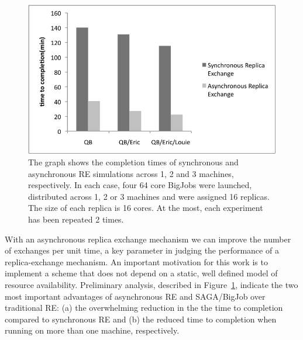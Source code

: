 \documentclass[a4paper,10pt]{article}
\newcommand{\athotanote}[1]{ {\textcolor{green} { ***athota: #1 }}}
\newcommand{\athotanote}[1]{}
\begin{document}
%
\begin{figure}
\centering
\includegraphics[scale=0.50]{figures/combined_graph.pdf}
\caption{\small The graph shows the completion times of synchronous and asynchronous RE simulations across 1, 2 and 3 machines, respectively. In each case, four 64 core BigJobs were launched, distributed across 1, 2 or 3 machines and were assigned 16 replicas. The size of each replica is 16 cores. At the most, each experiment has been repeated 2 times.}
\label{fig:graph}
\vspace{-1em}
\end{figure}

With an asynchronous replica exchange mechanism we can improve the
number of exchanges per unit time, a key parameter in judging the
performance of a replica-exchange mechanism.  An important motivation
for this work is to implement a scheme that does not depend on a
static, well defined model of resource availability. %
Preliminary analysis, described in Figure~\ref{fig:graph}, indicate the two most important advantages of asynchronous RE and SAGA/BigJob over traditional RE: (a) the overwhelming reduction in the the time to completion compared to synchronous RE and (b) the reduced time to completion when running on more than one machine, respectively.
\end{document}
